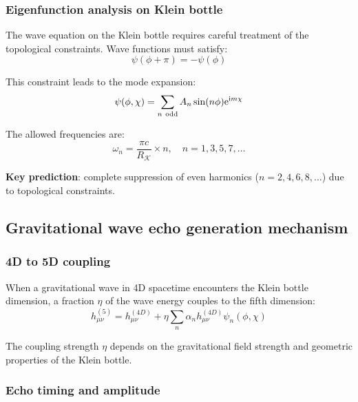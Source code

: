 \documentclass[12pt]{iopart}
\newcommand{\Klein}{\mathcal{K}}
\newcommand{\KleinRadius}{R_\Klein}
\begin{document}
\subsubsection{Eigenfunction analysis on Klein bottle}

The wave equation on the Klein bottle requires careful treatment of the topological constraints. Wave functions must satisfy:
\begin{equation}
\psi(\phi + \pi) = -\psi(\phi)
\label{eq:klein_constraint}
\end{equation}

This constraint leads to the mode expansion:
\begin{equation}
\psi(\phi, \chi) = \sum_{n \mathrm{\ odd}} A_n \sin(n\phi) {\rm e}^{{\rm i}m\chi}
\label{eq:mode_expansion}
\end{equation}

The allowed frequencies are:
\begin{equation}
\omega_n = \frac{\pi c}{\KleinRadius} \times n, \quad n = 1, 3, 5, 7, \ldots
\label{eq:allowed_frequencies}
\end{equation}

\textbf{Key prediction}: complete suppression of even harmonics ($n = 2, 4, 6, 8, \ldots$) due to topological constraints.

\subsection{Gravitational wave echo generation mechanism}

\subsubsection{4D to 5D coupling}

When a gravitational wave in 4D spacetime encounters the Klein bottle dimension, a fraction $\eta$ of the wave energy couples to the fifth dimension:
\begin{equation}
h^{(5)}_{\mu\nu} = h^{(4D)}_{\mu\nu} + \eta \sum_{n} \alpha_n h^{(4D)}_{\mu\nu} \psi_n(\phi, \chi)
\label{eq:4d_5d_coupling}
\end{equation}

The coupling strength $\eta$ depends on the gravitational field strength and geometric properties of the Klein bottle.

\subsubsection{Echo timing and amplitude}
\end{document}

